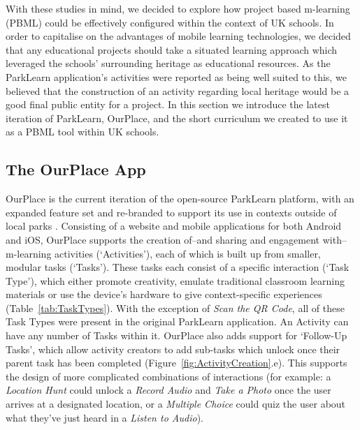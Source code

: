 \documentclass[,hyphens]{sigchi}
\begin{document}
With these studies in mind, we decided to explore how project based m-learning  (PBML) could be effectively configured within the context of UK schools. In order to capitalise on the advantages of mobile learning technologies, we decided that any educational projects should take a situated learning approach which leveraged the schools' surrounding heritage as educational resources. As the ParkLearn application's activities were reported as being well suited to this, we believed that the construction of an activity regarding local heritage would be a good final public entity for a project. In this section we introduce the latest iteration of ParkLearn, OurPlace, and the short curriculum we created to use it as a PBML tool within UK schools.

\subsection{The OurPlace App}

OurPlace is the current iteration of the open-source ParkLearn platform, with an expanded feature set and re-branded to support its use in contexts outside of local parks \cite{Richardson2018a}. Consisting of a website and mobile applications for both Android and iOS, OurPlace supports the creation of--and sharing and engagement with--m-learning activities (`Activities'), each of which is built up from smaller, modular tasks (`Tasks'). These tasks each consist of a specific interaction (`Task Type'), which either promote creativity, emulate traditional classroom learning materials or use the device's hardware to give context-specific experiences (Table~\ref{tab:TaskTypes}). With the exception of \textit{Scan the QR Code}, all of these Task Types were present in the original ParkLearn application. An Activity can have any number of Tasks within it. OurPlace also adds support for `Follow-Up Tasks', which allow activity creators to add sub-tasks which unlock once their parent task has been completed (Figure~\ref{fig:ActivityCreation}.e). This supports the design of more complicated combinations of interactions (for example: a \textit{Location Hunt} could unlock a \textit{Record Audio} and \textit{Take a Photo} once the user arrives at a designated location, or a \textit{Multiple Choice} could quiz the user about what they've just heard in a \textit{Listen to Audio}).
\end{document}
